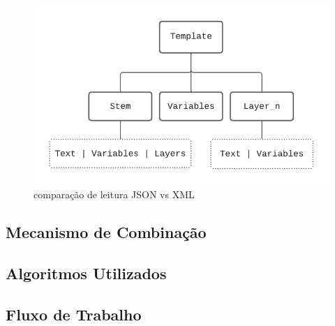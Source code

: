 \begin{figure}[ht]
	\centering
	\includegraphics[width=14cm]{./imagens/capitulo5/template-json-example-1}
	\caption{comparação de leitura JSON vs XML }
	\label{fig:template-json-example-1}
\end{figure}


\subsection{Mecanismo de Combinação}


\subsection{Algoritmos Utilizados}

\subsection{Fluxo de Trabalho}